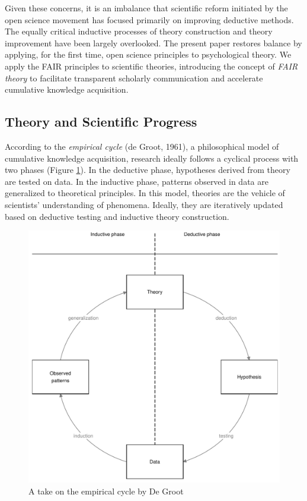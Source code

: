 \documentclass[
  man,floatsintext]{apa6}
\begin{document}
Given these concerns, it is an imbalance that scientific reform initiated by the open science movement has focused primarily on improving deductive methods.
The equally critical inductive processes of theory construction and theory improvement have been largely overlooked.
The present paper restores balance by applying, for the first time,
open science principles to psychological theory.
We apply the FAIR principles to scientific theories,
introducing the concept of \emph{FAIR theory} to
facilitate transparent scholarly communication and accelerate cumulative knowledge acquisition.

\subsection{Theory and Scientific Progress}\label{theory-and-scientific-progress}

According to the \emph{empirical cycle} (de Groot, 1961),
a philosophical model of cumulative knowledge acquisition,
research ideally follows a cyclical process with two phases (Figure \ref{fig:figec}).
In the deductive phase, hypotheses derived from theory are tested on data. In the inductive phase, patterns observed in data are generalized to theoretical principles.
In this model, theories are the vehicle of scientists' understanding of phenomena.
Ideally, they are iteratively updated based on deductive testing and inductive theory construction.

\begin{figure}
\centering
\includegraphics{empirical_cycle.pdf}
\caption{\label{fig:figec}A take on the empirical cycle by De Groot}
\end{figure}
\end{document}
